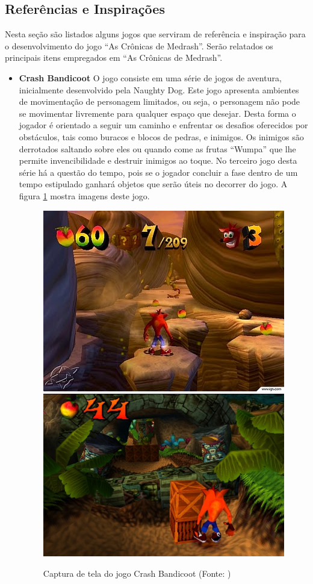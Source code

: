 \subsection{Referências e Inspirações}
Nesta seção são listados alguns jogos que serviram de referência e inspiração 
para o desenvolvimento do jogo ``As Crônicas de Medrash''. Serão relatados os principais 
itens empregados em ``As Crônicas de Medrash''.

\begin{itemize}
\item {\bf Crash Bandicoot}
O jogo consiste 
em uma série de jogos de aventura, inicialmente desenvolvido pela Naughty Dog.
Este jogo apresenta ambientes de movimentação de personagem limitados, ou seja, 
o personagem não pode se movimentar livremente para qualquer espaço que desejar.
 Desta forma o jogador é orientado a seguir um caminho e enfrentar os desafios 
oferecidos por obstáculos, tais como buracos e blocos de pedras, e inimigos.
Os inimigos são derrotados saltando sobre eles ou quando come as frutas ``Wumpa'' que lhe 
permite invencibilidade e destruir inimigos ao toque.
No terceiro jogo desta série há a questão do tempo, pois se o jogador concluir a fase
 dentro de um tempo estipulado ganhará objetos que serão úteis no decorrer do jogo. A figura \ref{img:crash} mostra imagens deste jogo.

\begin{figure}[!ht]
 \centering
 \includegraphics[scale=0.705]{Imagens/crash1.png}
 \includegraphics[scale=0.57]{Imagens/crash2.png}
 \caption{Captura de tela do jogo Crash Bandicoot 
(Fonte: \cite{bib:crash01,bib:crash02})}
 \label{img:crash}
\end{figure}


\end{itemize}
